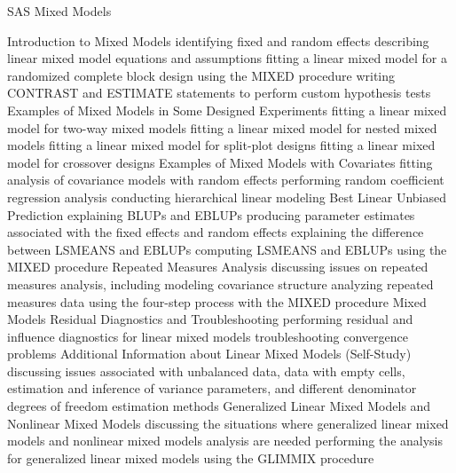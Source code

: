 SAS Mixed Models

Introduction to Mixed Models
identifying fixed and random effects
describing linear mixed model equations and assumptions
fitting a linear mixed model for a randomized complete block design using the MIXED procedure
writing CONTRAST and ESTIMATE statements to perform custom hypothesis tests
Examples of Mixed Models in Some Designed Experiments
fitting a linear mixed model for two-way mixed models
fitting a linear mixed model for nested mixed models
fitting a linear mixed model for split-plot designs
fitting a linear mixed model for crossover designs
Examples of Mixed Models with Covariates
fitting analysis of covariance models with random effects
performing random coefficient regression analysis
conducting hierarchical linear modeling
Best Linear Unbiased Prediction
explaining BLUPs and EBLUPs
producing parameter estimates associated with the fixed effects and random effects
explaining the difference between LSMEANS and EBLUPs
computing LSMEANS and EBLUPs using the MIXED procedure
Repeated Measures Analysis
discussing issues on repeated measures analysis, including modeling covariance structure
analyzing repeated measures data using the four-step process with the MIXED procedure
Mixed Models Residual Diagnostics and Troubleshooting
performing residual and influence diagnostics for linear mixed models
troubleshooting convergence problems
Additional Information about Linear Mixed Models (Self-Study)
discussing issues associated with unbalanced data, data with empty cells, estimation and inference of variance parameters, and different denominator degrees of freedom estimation methods
Generalized Linear Mixed Models and Nonlinear Mixed Models
discussing the situations where generalized linear mixed models and nonlinear mixed models analysis are needed
performing the analysis for generalized linear mixed models using the GLIMMIX procedure

